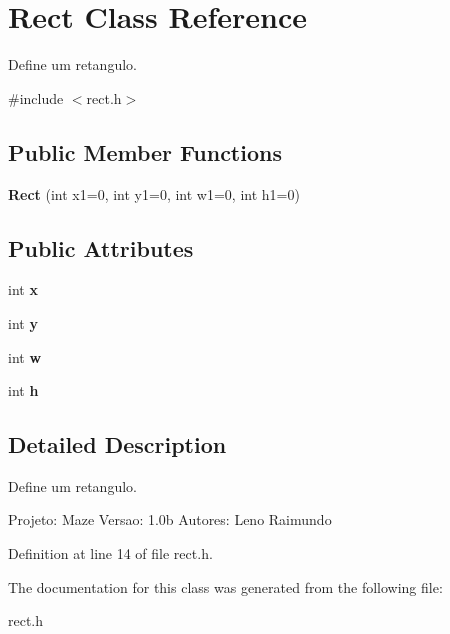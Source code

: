 \hypertarget{class_rect}{}\section{Rect Class Reference}
\label{class_rect}


Define um retangulo.  




{\ttfamily \#include $<$rect.\+h$>$}

\subsection*{Public Member Functions}
\begin{DoxyCompactItemize}
\item 
\hypertarget{class_rect_a5b9c0acb135c198ca69354a67bf7e054}{}{\bfseries Rect} (int x1=0, int y1=0, int w1=0, int h1=0)\label{class_rect_a5b9c0acb135c198ca69354a67bf7e054}

\end{DoxyCompactItemize}
\subsection*{Public Attributes}
\begin{DoxyCompactItemize}
\item 
\hypertarget{class_rect_a64d1ef14e429e1816539de4c54361e55}{}int {\bfseries x}\label{class_rect_a64d1ef14e429e1816539de4c54361e55}

\item 
\hypertarget{class_rect_a1e37b6f8a4fb0d68ba22c8fffffab0a4}{}int {\bfseries y}\label{class_rect_a1e37b6f8a4fb0d68ba22c8fffffab0a4}

\item 
\hypertarget{class_rect_a36b6c8bb15c7706c3b2b3e91345e11f8}{}int {\bfseries w}\label{class_rect_a36b6c8bb15c7706c3b2b3e91345e11f8}

\item 
\hypertarget{class_rect_af9111a21106ba65952da60320ea91df6}{}int {\bfseries h}\label{class_rect_af9111a21106ba65952da60320ea91df6}

\end{DoxyCompactItemize}


\subsection{Detailed Description}
Define um retangulo. 

Projeto\+: Maze Versao\+: 1.\+0b Autores\+: Leno Raimundo 

Definition at line 14 of file rect.\+h.



The documentation for this class was generated from the following file\+:\begin{DoxyCompactItemize}
\item 
rect.\+h\end{DoxyCompactItemize}
